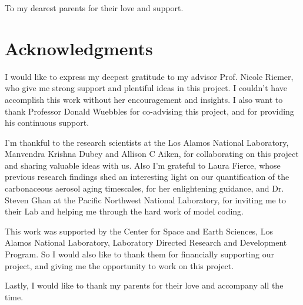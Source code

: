 \documentclass[12pt, fullpage]{uiucthesis2009_2}
\begin{document}
\begin{dedication}
To my dearest parents for their love and support.
\end{dedication}

\chapter*{Acknowledgments}

I would like to express my deepest gratitude to my advisor Prof. Nicole Riemer, who give me strong support and plentiful ideas in this project. I couldn't have accomplish this work without her encouragement and insights. I also want to thank Professor Donald Wuebbles for co-advising this project, and for providing his continuous support.

I'm thankful to the research scientists at the Los Alamos National Laboratory, Manvendra Krishna Dubey and Allison C Aiken, for collaborating on this project and sharing valuable ideas with us. Also I'm grateful to Laura Fierce, whose previous research findings shed an interesting light on our quantification of the carbonaceous aerosol aging timescales, for her enlightening guidance, and Dr. Steven Ghan at the Pacific Northwest National Laboratory, for inviting me to their Lab and helping me through the hard work of model coding.

This work was supported by the Center for Space and Earth Sciences, Los Alamos National Laboratory, Laboratory Directed Research and Development Program. So I would also like to thank them for financially supporting our project, and giving me the opportunity to work on this project.

Lastly, I would like to thank my parents for their love and accompany all the time.

\end{document}
